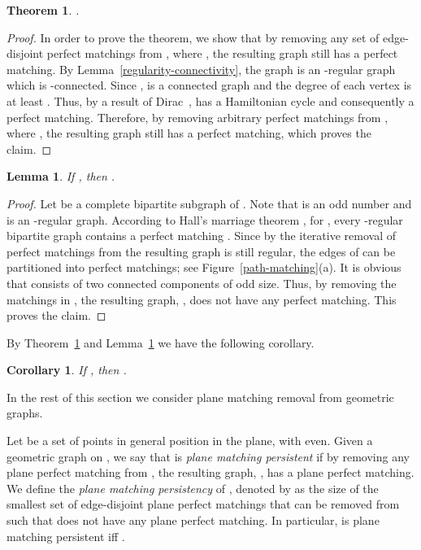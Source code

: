 \documentclass[11pt,a4paper]{article}
\newtheorem{lemma}{Lemma}
\newtheorem{corollary}{Corollary}
\newtheorem{theorem}{Theorem}
\begin{document}
\begin{theorem}
\label{mp-thr}
 .
\end{theorem}
\begin{proof}
In order to prove the theorem, we show that by removing any set  of  edge-disjoint perfect matchings from , where , the resulting graph still has a perfect matching. By Lemma~\ref{regularity-connectivity}, the graph  is an -regular graph which is -connected. Since ,  is a connected graph and the degree of each vertex is at least . Thus, by a result of 
Dirac~\cite{Dirac1952},  has a Hamiltonian cycle and consequently a perfect matching. Therefore, by removing  arbitrary perfect matchings from , where , the resulting graph still has a perfect matching, which proves the claim.
\end{proof}

\begin{lemma}
\label{bipartite-matchings-lemma}
 If , then .
\end{lemma}
\begin{proof}
Let  be a complete bipartite subgraph of . Note that  is an odd number and  is an -regular graph.
According to Hall's marriage theorem \cite{Hall1935}, for , every -regular bipartite graph contains a perfect matching \cite{Harary1991}. Since by the iterative removal of perfect matchings  from  the resulting graph is still regular, the edges of  can be partitioned into  perfect matchings; see Figure~\ref{path-matching}(a). It is obvious that  consists of two connected components of odd size. Thus, by removing the  matchings in , the resulting graph, , does not have any perfect matching. This proves the claim.
\end{proof}

By Theorem~\ref{mp-thr} and Lemma~\ref{bipartite-matchings-lemma} we have the following corollary.

\begin{corollary}
If , then . 
\end{corollary}

In the rest of this section we consider plane matching removal from geometric graphs.

Let  be a set of  points in general position in the plane, with  even. Given a geometric graph  on , we say that  is {\em plane matching persistent} if by removing any plane perfect matching  from , the resulting graph, , has a plane perfect matching. We define the {\em plane matching persistency} of , denoted by  as the size of the smallest set  of edge-disjoint plane perfect matchings that can be removed from  such that  does not have any plane perfect matching. In particular,  is plane matching persistent iff .
\end{document}
